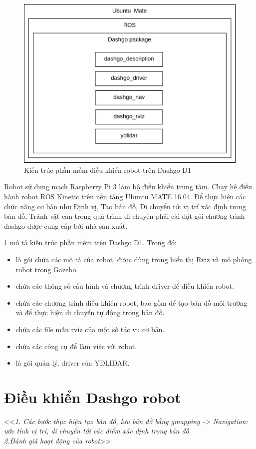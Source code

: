 \begin{figure}[htbp]
    \centering
    \includegraphics[width=0.7\linewidth]{figures/dashgo-architecture.png}
    \caption{Kiến trúc phần mềm điều khiển robot trên Dashgo D1}
    \label{fig:dashgo-architecture}
\end{figure}

Robot sử dụng mạch Raspberry Pi 3 làm bộ điều khiển trung tâm. Chạy hệ điều hành robot ROS Kinetic trên nền tảng Ubuntu MATE 16.04. Để thực hiện các chức năng cơ bản như Định vị, Tạo bản đồ, Di chuyển tới vị trí xác định trong bản đồ, Tránh vật cản trong quá trình di chuyển phải cài đặt gói chương trình dashgo được cung cấp bởi nhà sản xuất.

\figurename{\ref{fig:dashgo-architecture}} mô tả kiến trúc phần mềm trên Dashgo D1. Trong đó:
\begin{itemize}
    \item {} là gói chứa các mô tả của robot, được dùng trong hiển thị Rviz và mô phỏng robot trong Gazebo.
    \item {} chứa các thông số cấu hình và chương trình driver để điều khiển robot.
    \item {} chứa các chương trình điều khiển robot, bao gồm  để tạo bản đồ môi trường và  để thực hiện di chuyển tự động trong bản đồ.
    \item {} chứa các file mẫu rviz của một số tác vụ cơ bản.
    \item {} chứa các công cụ để làm việc với robot.
    \item {} là gói quản lý, driver của YDLIDAR.
\end{itemize}

\section{Điều khiển Dashgo robot}
<<\textit{1. Các bước thực hiện tạo bản đồ, lưu bản đồ bằng gmapping -> Navigation: ước tính vị trí, di chuyển tới các điểm xác định trong bản đồ\\}
\textit{2.Đánh giá hoạt động của robot}>>

